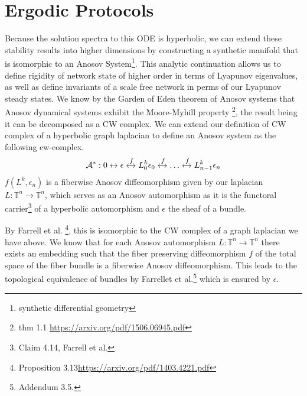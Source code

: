 \documentclass{article}
\begin{document}
\section{Ergodic Protocols}
Because the solution spectra to this ODE is hyperbolic, we can extend these stability results into higher dimensions by constructing a synthetic manifold that is isomorphic to an Anosov System\footnote{synthetic differential geometry}. This analytic continuation allows us to define rigidity of network state of higher order in terms of Lyapunov eigenvalues, as well as define invariants of a scale free network in perms of our Lyapunov steady states. We know by the Garden of Eden theorem of Anosov systems that Anosov dynamical systems exhibit the Moore-Myhill property \footnote{thm 1.1 \url{https://arxiv.org/pdf/1506.06945.pdf}}, the result being it can be decomposed as a CW complex. We can extend our definition of CW complex of a hyperbolic graph laplacian to define an Anosov system as the following cw-complex.
\begin{equation} \label{eq1}
\begin{split}
\mathcal{A}^* : 0 \leftrightarrow \epsilon \xleftrightarrow{f} L^k_0 \epsilon_0 \xleftrightarrow{f} \dots  \xleftrightarrow{f} L^k_{n-1} \epsilon_n
\end{split}
\end{equation}
$f(L^{k}, \epsilon_n)$ is a fiberwise Anosov diffeomorphism given by our laplacian $L: \mathbb{T}^n \rightarrow \mathbb{T}^n$, 
which serves as an Anosov automorphism as it is the functoral 
carrier\footnote{Claim 4.14, Farrell et al.} of a hyperbolic automorphism and $\epsilon$ the sheaf of a bundle. 

By Farrell et al. \footnote{Proposition 3.13\url{https://arxiv.org/pdf/1403.4221.pdf}}, this is isomorphic to the CW complex of a graph laplacian we have above. We know that for each Anosov automorphism $L: \mathbb{T}^n \rightarrow \mathbb{T}^n$ there exists an embedding such that the fiber preserving diffeomorphism $f$ of the total space of the fiber bundle is a fiberwise Anosov diffeomorphism. This leads to the topological equivalence of bundles by Farrellet et al.\footnote{Addendum 3.5.} which is ensured by $\epsilon$.
\end{document}
